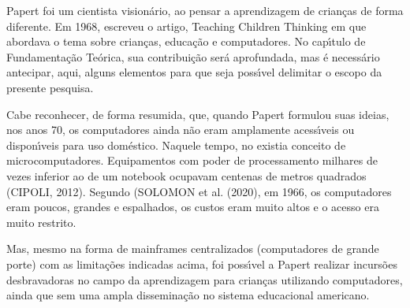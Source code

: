 \documentclass[
12pt,		%
openright,	%
twoside,  %
a4paper,			%
chapter=TITLE,		%
english,			%
french,				%
spanish,			%
brazil				%
]{USPSC-classe/USPSC}
\begin{document}
Papert foi um cientista vision\'ario, ao pensar a aprendizagem de crian\c{c}as de forma diferente. Em 1968, escreveu o artigo, \textquotedbl  Teaching Children Thinking \textquotedbl   em que abordava  o tema sobre crian\c{c}as, educa\c{c}\~ao e computadores. No cap\'{\i}tulo de Fundamenta\c{c}\~ao Te\'orica, sua contribui\c{c}\~ao ser\'a aprofundada, mas \'e necess\'ario antecipar, aqui, alguns elementos para que seja poss\'{\i}vel delimitar o escopo da presente pesquisa.

















Cabe reconhecer, de forma resumida, que, quando Papert formulou suas ideias, nos anos 70, os computadores ainda n\~ao eram amplamente acess\'{\i}veis ou dispon\'{\i}veis para uso dom\'estico. Naquele tempo, no existia conceito de \textquotedbl microcomputadores\textquotedbl . Equipamentos com poder de processamento milhares de vezes inferior ao de um notebook ocupavam centenas de metros quadrados (CIPOLI, 2012). Segundo (SOLOMON et al. (2020), \textquotedbl em 1966, os computadores eram poucos, grandes e espalhados\textquotedbl , os custos eram muito altos e o acesso era muito restrito.

















Mas, mesmo na forma de mainframes centralizados (computadores de grande porte) com as limita\c{c}\~oes indicadas acima, foi poss\'{\i}vel a Papert realizar incurs\~oes desbravadoras no campo da aprendizagem para crian\c{c}as utilizando computadores, ainda que sem uma ampla dissemina\c{c}\~ao no sistema educacional americano.
\end{document}
